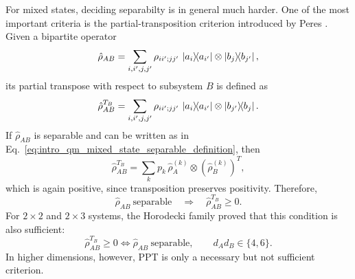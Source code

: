 For mixed states, deciding separabilty is in general much harder. One of the most important criteria is the partial-transposition criterion introduced by Peres \cite{Peres96}. Given a bipartite operator
\begin{equation}
	\hat \rho_{AB}
	=
	\sum_{i,i',j,j'} \rho_{ii';jj'}\,
	\dyad{a_i}{a_{i'}}\otimes\dyad{b_j}{b_{j'}},
	\label{eq:intro_qm_bipartite_state_for_partial_transpose}
\end{equation}
its partial transpose with respect to subsystem $B$ is defined as
\begin{equation}
	\hat \rho_{AB}^{T_B}
	=
	\sum_{i,i',j,j'} \rho_{ii';jj'}\,
	\dyad{a_i}{a_{i'}}\otimes\dyad{b_{j'}}{b_j}.
	\label{eq:intro_qm_partial_transpose_definition}
\end{equation}
If $\hat \rho_{AB}$ is separable and can be written as in Eq.~\eqref{eq:intro_qm_mixed_state_separable_definition}, then
\begin{equation}
	\hat \rho_{AB}^{T_B}
	=
	\sum_k p_k \,\hat \rho_A^{(k)}\otimes \left(\hat \rho_B^{(k)}\right)^T,
	\label{eq:intro_qm_partial_transpose_separable_state}
\end{equation}
which is again positive, since transposition preserves positivity. Therefore,
\begin{equation}
	\hat \rho_{AB}\ \text{separable}
	\quad \Longrightarrow \quad
	\hat \rho_{AB}^{T_B}\geq 0.
	\label{eq:intro_qm_peres_criterion_necessary}
\end{equation}
For $2\times2$ and $2\times3$ systems, the Horodecki family \cite{Horodecki3_96} proved that this condition is also sufficient:
\begin{equation}
	\hat \rho_{AB}^{T_B}\geq 0
	\iff
	\hat \rho_{AB}\ \text{separable},
	\qquad
	d_A d_B \in \{4,6\}.
	\label{eq:intro_qm_peres_horodecki_criterion}
\end{equation}
In higher dimensions, however, PPT is only a necessary but not sufficient criterion.

